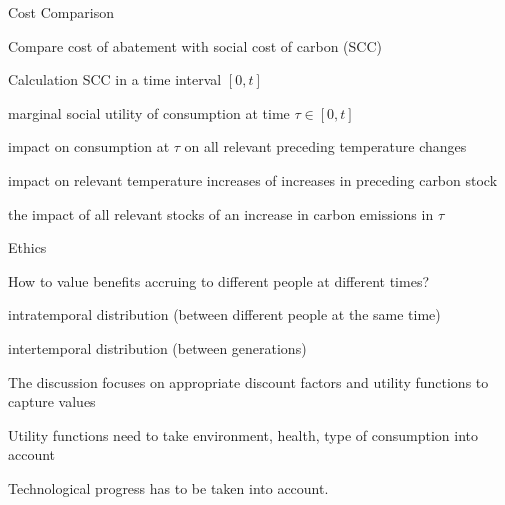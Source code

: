 {Cost Comparison}






	Compare cost of abatement with social cost of carbon (SCC)

	Calculation SCC in a time interval $[0,t]$






	marginal social utility of consumption at time $\tau \in [0,t]$

	impact on consumption at $\tau$ on all relevant preceding temperature changes

	impact on relevant temperature increases of increases in preceding carbon stock

	the impact of all relevant stocks of an increase in carbon emissions in $\tau$












{Ethics}






	How to value benefits accruing to different people at different times?






	intratemporal distribution (between different people at the same time)

	intertemporal distribution (between generations)






	The discussion focuses on appropriate discount factors and utility functions to capture values

	Utility functions need to take environment, health, type of consumption into account

	Technological progress has to be taken into account.




